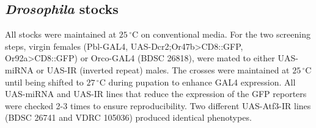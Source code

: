 \subsection*{\emph{Drosophila} stocks}

All stocks were maintained at $25\,^{\circ}\mathrm{C}$ on conventional media.
For the two screening steps, virgin females (Pbl-GAL4, UAS-Dcr2;Or47b\textgreater{}CD8::GFP, Or92a\textgreater{}CD8::GFP) or Orco-GAL4 (BDSC 26818), were mated to either UAS-miRNA or UAS-IR (inverted repeat) males.
The crosses were maintained at $25\,^{\circ}\mathrm{C}$ until being shifted to $27\,^{\circ}\mathrm{C}$ during pupation to enhance GAL4 expression.
All UAS-miRNA and UAS-IR lines that reduce the expression of the GFP reporters were checked 2-3 times to ensure reproducibility.
Two different UAS-Atf3-IR lines (BDSC 26741 and VDRC 105036) produced identical phenotypes.